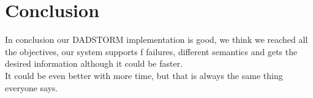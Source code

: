 \documentclass[times, 10pt, twocolumn]{article}
\begin{document}
\section{Conclusion}
In conclusion our DADSTORM implementation is good, we think we reached all the objectives, our system supports f failures, different semantics and gets the desired information although it could be faster.
\\It could be even better with more time, but that is always the same thing everyone says.
\end{document}

